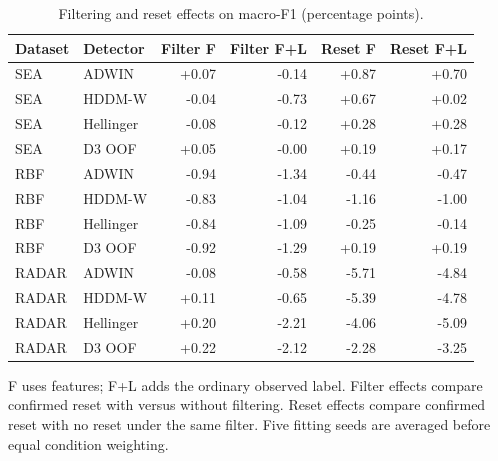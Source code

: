 \begin{table}[htbp]
\centering\small\singlespacing
\caption{Filtering and reset effects on macro-F1 (percentage points).}\label{tab:filters}
\setlength{\tabcolsep}{4pt}
\renewcommand{\arraystretch}{1.18}
\begin{tabular}{@{}llrrrr@{}}
\toprule
Dataset & Detector & Filter F & Filter F+L & Reset F & Reset F+L \\
\midrule
SEA & ADWIN & +0.07 & -0.14 & +0.87 & +0.70 \\
SEA & HDDM-W & -0.04 & -0.73 & +0.67 & +0.02 \\
SEA & Hellinger & -0.08 & -0.12 & +0.28 & +0.28 \\
SEA & D3 OOF & +0.05 & -0.00 & +0.19 & +0.17 \\
RBF & ADWIN & -0.94 & -1.34 & -0.44 & -0.47 \\
RBF & HDDM-W & -0.83 & -1.04 & -1.16 & -1.00 \\
RBF & Hellinger & -0.84 & -1.09 & -0.25 & -0.14 \\
RBF & D3 OOF & -0.92 & -1.29 & +0.19 & +0.19 \\
RADAR & ADWIN & -0.08 & -0.58 & -5.71 & -4.84 \\
RADAR & HDDM-W & +0.11 & -0.65 & -5.39 & -4.78 \\
RADAR & Hellinger & +0.20 & -2.21 & -4.06 & -5.09 \\
RADAR & D3 OOF & +0.22 & -2.12 & -2.28 & -3.25 \\
\bottomrule
\end{tabular}
\par\smallskip\begin{minipage}{\textwidth}\footnotesize F uses features; F+L adds the ordinary observed label. Filter effects compare confirmed reset with versus without filtering. Reset effects compare confirmed reset with no reset under the same filter. Five fitting seeds are averaged before equal condition weighting.\end{minipage}
\end{table}
